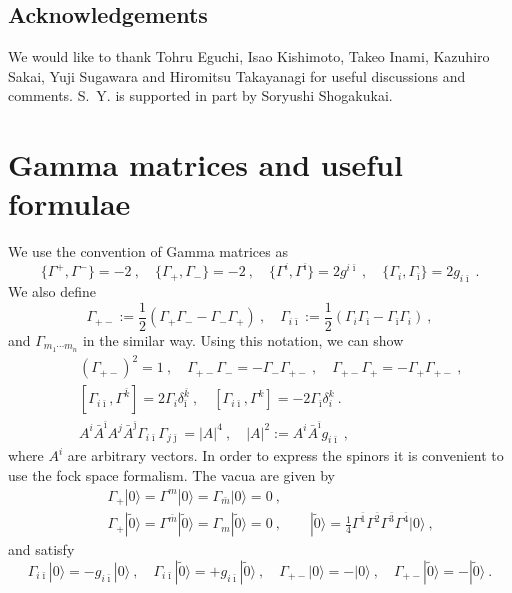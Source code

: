 \documentclass[a4paper,12pt]{article}
\numberwithin{equation}{section}
\newcommand{\ib}{\bar{\imath}}
\newcommand{\jb}{\bar{\jmath}}
\newcommand{\kb}{\bar{k}}
\newcommand{\mb}{\bar{m}}
\newcommand{\vac}{|0\rangle}
\newcommand{\vact}{|\tilde 0\rangle}
\newcommand{\nn}{\nonumber\\}
\begin{document}


\subsection*{Acknowledgements}
We would like to thank Tohru Eguchi, Isao Kishimoto, Takeo Inami,
Kazuhiro Sakai, Yuji Sugawara
and Hiromitsu Takayanagi for useful discussions and comments.
S.~Y. is supported in part by Soryushi Shogakukai.


\appendix
\section{Gamma matrices and useful formulae}

We use the convention of Gamma matrices as
\begin{equation}
 \{\Gamma^{+},\Gamma^{-}\}=-2~,\quad \{\Gamma_{+}, \Gamma_{-}\}=-2~, \quad
 \{\Gamma^{i},\Gamma^{\ib}\}=2g^{i\ib}~,\quad    
           \{\Gamma_{i},\Gamma_{\ib}\}=2g_{i\ib} ~.
\end{equation}
We also define
\begin{equation}
\Gamma_{+-}:=\frac12(\Gamma_+ \Gamma_- - \Gamma_- \Gamma_+)~,\quad
  \Gamma_{i\ib}:=\frac12(\Gamma_i \Gamma_{\ib} - \Gamma_{\ib} \Gamma_i)~,
\end{equation}
and $\Gamma_{m_1 \cdots m_n}$ in the similar way.
Using this notation, we can show
\begin{eqnarray}
 &&(\Gamma_{+-})^2=1~,\quad
   \Gamma_{+-}\Gamma_{-}=-\Gamma_{-}\Gamma_{+-}~,\quad
  \Gamma_{+-}\Gamma_{+}=-\Gamma_{+}\Gamma_{+-}~,\nn
 &&[\Gamma_{i\ib},\Gamma^{\kb}]=2\Gamma_{i}\delta^{\kb}_{\ib}~,\quad
  [\Gamma_{i\ib},\Gamma^{k}]=-2\Gamma_{\ib}\delta^{k}_{i}~.\nn
 &&A^{i}\bar A^{\ib}A^{j}\bar A^{\jb}\Gamma_{i\ib}\Gamma_{j\jb}
   =|A|^4 ~, \quad |A|^2 := A^{i}\bar A^{\ib}g_{i\ib}~,
\end{eqnarray}
where $A^i$ are arbitrary vectors.
In order to express the spinors it is convenient to use the fock space
formalism. The vacua are given by
\begin{eqnarray}
 &&\Gamma_{+}\vac=\Gamma^{m} \vac=\Gamma_{\mb} \vac=0~,\nn
 &&\Gamma_{+}\vact=\Gamma^{\mb} \vact=\Gamma_{m} \vact=0~,
\qquad \vact
 =\frac14 \Gamma^{\bar 1}\Gamma^{\bar 2}\Gamma^{\bar 3}\Gamma^{\bar 4}\vac~,
\end{eqnarray}
and satisfy
\begin{equation}
 \Gamma_{i\ib}\vac=-g_{i\ib}\vac~,\quad
        \Gamma_{i\ib}\vact=+g_{i\ib}\vact~,\quad
 \Gamma_{+-}\vac=-\vac~,\quad \Gamma_{+-}\vact=-\vact~.
\end{equation}
\end{document}
